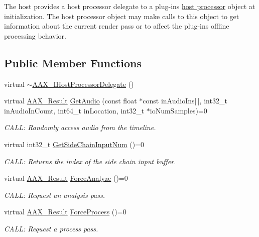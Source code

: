 The host provides a host processor delegate to a plug-\/in\textquotesingle{}s \hyperlink{a00101}{host processor} object at initialization. The host processor object may make calls to this object to get information about the current render pass or to affect the plug-\/in\textquotesingle{}s offline processing behavior. \subsection*{Public Member Functions}
\begin{DoxyCompactItemize}
\item 
virtual \hyperlink{a00102_ad3a419f006b4a5dda335d5c3aa0f8d9f}{$\sim$\+A\+A\+X\+\_\+\+I\+Host\+Processor\+Delegate} ()
\item 
virtual \hyperlink{a00149_a4d8f69a697df7f70c3a8e9b8ee130d2f}{A\+A\+X\+\_\+\+Result} \hyperlink{a00102_aa7d5eb30282956a40ed34acc5881298c}{Get\+Audio} (const float $\ast$const in\+Audio\+Ins\mbox{[}$\,$\mbox{]}, int32\+\_\+t in\+Audio\+In\+Count, int64\+\_\+t in\+Location, int32\+\_\+t $\ast$io\+Num\+Samples)=0
\begin{DoxyCompactList}\small\item\em C\+A\+L\+L\+: Randomly access audio from the timeline. \end{DoxyCompactList}\item 
virtual int32\+\_\+t \hyperlink{a00102_aaf6821f08105fd949aa9e78f3a1f7f50}{Get\+Side\+Chain\+Input\+Num} ()=0
\begin{DoxyCompactList}\small\item\em C\+A\+L\+L\+: Returns the index of the side chain input buffer. \end{DoxyCompactList}\item 
virtual \hyperlink{a00149_a4d8f69a697df7f70c3a8e9b8ee130d2f}{A\+A\+X\+\_\+\+Result} \hyperlink{a00102_a8ab521c8f0902707a8e8d67d7886d4f4}{Force\+Analyze} ()=0
\begin{DoxyCompactList}\small\item\em C\+A\+L\+L\+: Request an analysis pass. \end{DoxyCompactList}\item 
virtual \hyperlink{a00149_a4d8f69a697df7f70c3a8e9b8ee130d2f}{A\+A\+X\+\_\+\+Result} \hyperlink{a00102_a09793675802a25886bc050cee4b9f843}{Force\+Process} ()=0
\begin{DoxyCompactList}\small\item\em C\+A\+L\+L\+: Request a process pass. \end{DoxyCompactList}\end{DoxyCompactItemize}


